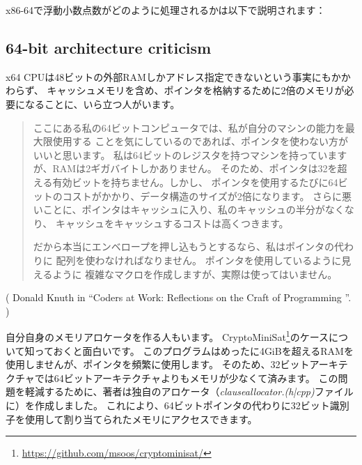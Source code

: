 x86-64で浮動小数点数がどのように処理されるかは以下で説明されます：

\subsection{64-bit architecture criticism}

x64 \ac{CPU}は48ビットの外部\ac{RAM}しかアドレス指定できないという事実にもかかわらず、
キャッシュメモリを含め、ポインタを格納するために2倍のメモリが必要になることに、いら立つ人がいます。

\begin{framed}
\begin{quotation}
ここにある私の64ビットコンピュータでは、私が自分のマシンの能力を最大限使用する
ことを気にしているのであれば、ポインタを使わない方がいいと思います。
私は64ビットのレジスタを持つマシンを持っていますが、RAMは2ギガバイトしかありません。
そのため、ポインタは32を超える有効ビットを持ちません。しかし、
ポインタを使用するたびに64ビットのコストがかかり、データ構造のサイズが2倍になります。 
さらに悪いことに、ポインタはキャッシュに入り、私のキャッシュの半分がなくなり、
キャッシュをキャッシュするコストは高くつきます。

だから本当にエンベロープを押し込もうとするなら、私はポインタの代わりに
配列を使わなければなりません。 ポインタを使用しているように見えるように
複雑なマクロを作成しますが、実際は使ってはいません。
\end{quotation}
\end{framed}

( Donald Knuth in ``Coders at Work: Reflections on the Craft of Programming ''. )

自分自身のメモリアロケータを作る人もいます。 
CryptoMiniSat\footnote{\url{https://github.com/msoos/cryptominisat/}}のケースについて知っておくと面白いです。
このプログラムはめったに4GiBを超える\ac{RAM}を使用しませんが、ポインタを頻繁に使用します。
そのため、32ビットアーキテクチャでは64ビットアーキテクチャよりもメモリが少なくて済みます。
この問題を軽減するために、著者は独自のアロケータ（\emph{clauseallocator.(h|cpp)}ファイルに）を作成しました。
これにより、64ビットポインタの代わりに32ビット識別子を使用して割り当てられたメモリにアクセスできます。
